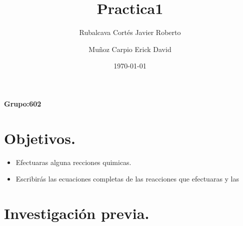 \documentclass[letter]{article}
\title{Practica1}
\author{
Rubalcava Cortés Javier Roberto
\and 
Muñoz Carpio Erick David
}
\date{\today}
\begin{document}
\maketitle
\begin{center}
    \textbf{Grupo:602}
\end{center}

\newpage

 
\tableofcontents{}
\newpage



\section{Objetivos.}

\begin{itemize}
    \item Efectuaras alguna recciones quimicas.
    \item Escribirás las ecuaciones completas de las reacciones que efectuaras y las
\end{itemize}

\section{Investigación previa.}
\end{document}
